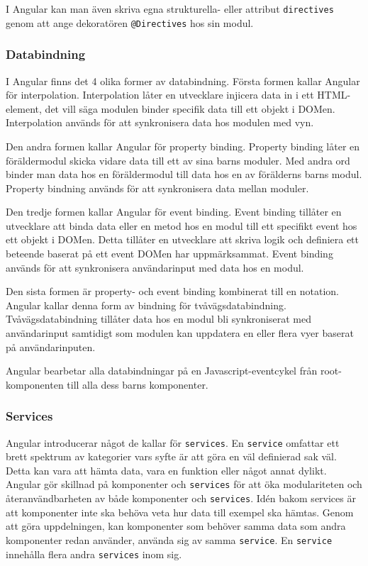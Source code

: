I Angular kan man även skriva egna strukturella- eller attribut \texttt{directives} genom att ange dekoratören \texttt{@Directives} hos sin modul. \cite{angular-components}


\subsubsection{Databindning}
\label{angular-data-binding}
I Angular finns det 4 olika former av databindning. \cite{angular-components} Första formen kallar Angular för interpolation. Interpolation låter en utvecklare injicera data in i ett HTML-element, det vill säga modulen binder specifik data till ett objekt i DOMen. Interpolation används för att synkronisera data hos modulen med vyn.

Den andra formen kallar Angular för property binding. Property binding låter en föräldermodul skicka vidare data till ett av sina barns moduler. Med andra ord binder man data hos en föräldermodul till data hos en av förälderns barns modul. Property bindning används för att synkronisera data mellan moduler. \cite{angular-databinding}

Den tredje formen kallar Angular för event binding. Event binding tillåter en utvecklare att binda data eller en metod hos en modul till ett specifikt event hos ett objekt i DOMen. Detta tillåter en utvecklare att skriva logik och definiera ett beteende baserat på ett event DOMen har uppmärksammat. Event binding används för att synkronisera användarinput med data hos en modul.

Den sista formen är property- och event binding kombinerat till en notation. Angular kallar denna form av bindning för tvåvägsdatabindning. Tvåvägsdatabindning tillåter data hos en modul bli synkroniserat med användarinput samtidigt som modulen kan uppdatera en eller flera vyer baserat på användarinputen.

Angular bearbetar alla databindningar på en Javascript-eventcykel från root-komponenten till alla dess barns komponenter. \cite{angular-components}


\subsubsection{Services}
\label{angular-services}
Angular introducerar något de kallar för \texttt{services}. En \texttt{service} omfattar ett brett spektrum av kategorier vars syfte är att göra en väl definierad sak väl. Detta kan vara att hämta data, vara en funktion eller något annat dylikt. Angular gör skillnad på komponenter och \texttt{services} för att öka modulariteten och återanvändbarheten av både komponenter och \texttt{services}. Idén bakom services är att komponenter inte ska behöva veta hur data till exempel ska hämtas. Genom att göra uppdelningen, kan komponenter som behöver samma data som andra komponenter redan använder, använda sig av samma \texttt{service}. \cite{angular-services} En \texttt{service} innehålla flera andra \texttt{services} inom sig.

